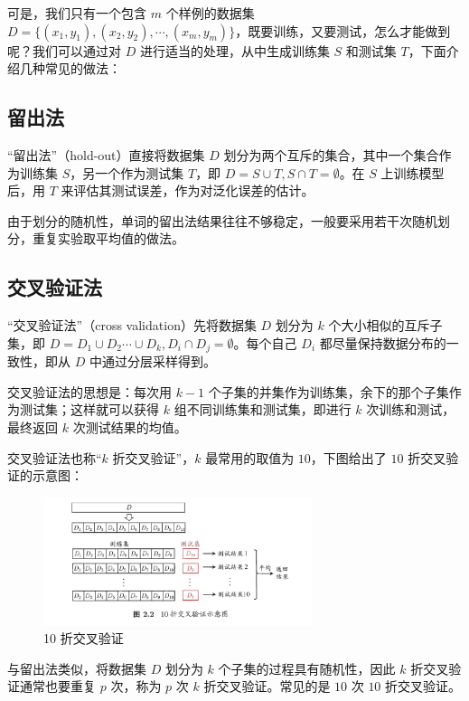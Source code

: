 \documentclass[12pt, a4paper]{article} %
\begin{document}
可是，我们只有一个包含 $m$ 个样例的数据集 $D = \{(x_1, y_1), (x_2, y_2), \cdots, (x_m, y_m)\}$，既要训练，又要测试，怎么才能做到呢？我们可以通过对 $D$ 进行适当的处理，从中生成训练集 $S$ 和测试集 $T$，下面介绍几种常见的做法：

\subsection{留出法}

“留出法”（hold-out）直接将数据集 $D$ 划分为两个互斥的集合，其中一个集合作为训练集 $S$，另一个作为测试集 $T$，即 $D = S \cup T, S \cap T = \emptyset$。在 $S$ 上训练模型后，用 $T$ 来评估其测试误差，作为对泛化误差的估计。

由于划分的随机性，单词的留出法结果往往不够稳定，一般要采用若干次随机划分，重复实验取平均值的做法。

\subsection{交叉验证法}

“交叉验证法”（cross validation）先将数据集 $D$ 划分为 $k$ 个大小相似的互斥子集，即 $D = D_1 \cup D_2 \cdots \cup D_k, D_i \cap D_j = \emptyset$。每个自己 $D_i$ 都尽量保持数据分布的一致性，即从 $D$ 中通过分层采样得到。

交叉验证法的思想是：每次用 $k - 1$ 个子集的并集作为训练集，余下的那个子集作为测试集；这样就可以获得 $k$ 组不同训练集和测试集，即进行 $k$ 次训练和测试，最终返回 $k$ 次测试结果的均值。

交叉验证法也称“$k$ 折交叉验证”，$k$ 最常用的取值为 $10$，下图给出了 $10$ 折交叉验证的示意图：

\begin{figure}[H]
    \centering
    \includegraphics[width=0.7\textwidth]{../img/2-1-10折交叉验证.png}
    \caption{10 折交叉验证}
    \label{fig:10 折交叉验证}
\end{figure}

与留出法类似，将数据集 $D$ 划分为 $k$ 个子集的过程具有随机性，因此 $k$ 折交叉验证通常也要重复 $p$ 次，称为 $p$ 次 $k$ 折交叉验证。常见的是 $10$ 次 $10$ 折交叉验证。
\end{document}
